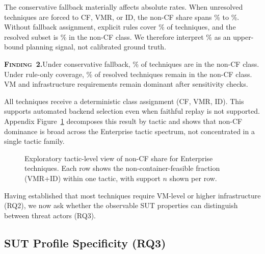 \documentclass[sigconf,anonymous,review]{acmart}
\newcommand{\finding}[2]{%
  \begin{findingenv}%
    \textsc{\textbf{Finding~#1.}}\enspace #2%
  \end{findingenv}%
}
\begin{document}
The conservative fallback materially affects absolute rates. When unresolved techniques are forced to CF, VMR, or ID, the non-CF share spans \compatibilitynoncffloorpercentage\% to \compatibilitynoncfceilingpercentage\%. Without fallback assignment, explicit rules cover \compatibilityrulecoveragepercentage\% of techniques, and the resolved subset is \compatibilitynoncfresolvedpercentage\% in the non-CF class. We therefore interpret \compatibilitynoncfceilingpercentage\% as an upper-bound planning signal, not calibrated ground truth.

\finding{2}{Under conservative fallback, \compatibilitynoncfceilingpercentage\% of techniques are in the non-CF class. Under rule-only coverage, \compatibilitynoncfresolvedpercentage\% of resolved techniques remain in the non-CF class. VM and infrastructure requirements remain dominant after sensitivity checks.}

All \enterpriseplatformcount{} techniques receive a deterministic class assignment (CF, VMR, ID). This supports automated backend selection even when faithful replay is not supported. Appendix Figure~\ref{fig:compatibility_by_tactic} decomposes this result by tactic and shows that non-CF dominance is broad across the Enterprise tactic spectrum, not concentrated in a single tactic family.

\begin{figure}[!htb]
\centering
\resizebox{\columnwidth}{!}{}
\caption{\label{fig:compatibility_by_tactic}Exploratory tactic-level view of non-CF share
for Enterprise techniques. Each row shows the non-container-feasible fraction
(VMR+ID) within one tactic, with support $n$ shown per row.}
\end{figure}

Having established that most techniques require VM-level or higher infrastructure (RQ2), we now ask whether the observable SUT properties can distinguish between threat actors (RQ3).

\subsection{SUT Profile Specificity (RQ3)}
\end{document}
